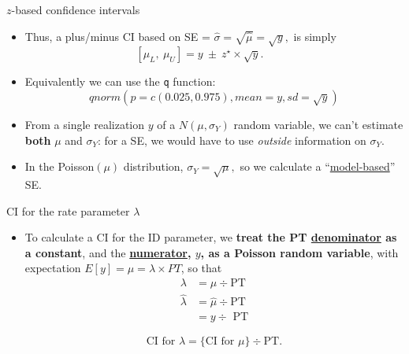 \documentclass[handout]{beamer}\usepackage[]{graphicx}\usepackage[]{color}
\begin{document}
\begin{frame}{$z$-based confidence intervals}
\begin{itemize}
	\setlength\itemsep{1.1em}
	\item Thus, a plus/minus CI based on SE = $\hat{\sigma} =  \sqrt{\hat{\mu}} = \sqrt{y},$   is simply
	$$[ \mu_{L}, \ \mu_{U}] = y  \ \pm \ z^\star \times \sqrt{y}. \ \ \ \ \ \ \ \ \ \ \ \  $$
	\item Equivalently we can use the \texttt{q} function: $$qnorm(p = c(0.025, 0.975), mean = y, sd = \sqrt{y})$$
	\pause 
	
	\vspace*{-0.7cm}
	
	\item From a single realization $y$ of a $N(\mu,\sigma_{Y})$ random variable, we can't estimate \textbf{both} $\mu$ and $\sigma_{Y}$: for a SE, we would have to use \textit{outside} information on $\sigma_{Y}$.  
	
	\pause 
	
	\item In the  Poisson$(\mu)$ distribution, $\sigma_{Y} = \sqrt{\mu},$ so we  calculate a ``\underline{model-based}'' SE.
	
	
\end{itemize}

\end{frame}

\begin{frame}{CI for the rate  parameter $\lambda$}

\begin{itemize}
	\item To calculate a CI for the ID parameter, we \textbf{treat the PT \underline{denominator} as a constant}, and the \textbf{\underline{numerator}, $y$,  as a Poisson random variable}, with expectation $E[y] = \mu = \lambda \times PT$, so that
	\begin{align*}
	\lambda &= \mu \div \textrm{PT}\\
	\hat{\lambda} &= \hat{\mu} \div \textrm{PT} \\
	& = y\div\textrm{ PT}
	\end{align*}
	
	
	
	\vspace*{0.3in}
	\begin{equation}
	\boxed{\textrm{CI for }\lambda = \{\textrm{CI for }\mu\} \div \textrm{PT}.}
	\end{equation}
	
	
\end{itemize}
\end{frame}
\end{document}

